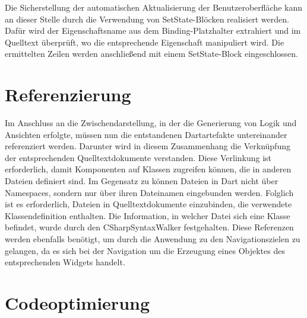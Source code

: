  

Die Sicherstellung der automatischen Aktualisierung der Benutzeroberfläche kann an dieser Stelle durch die Verwendung von SetState-Blöcken realisiert werden.  Dafür wird der Eigenschaftsname aus dem Binding-Platzhalter extrahiert und im Quelltext überprüft, wo die entsprechende Eigenschaft manipuliert wird.  Die ermittelten Zeilen werden anschließend mit einem SetState-Block eingeschlossen.


\section{Referenzierung}
Im Anschluss an die Zwischendarstellung, in der die Generierung von Logik und Ansichten erfolgte,  müssen nun die entstandenen Dartartefakte untereinander referenziert werden.  Darunter wird in diesem Zusammenhang die Verknüpfung der entsprechenden Quelltextdokumente verstanden.  Diese Verlinkung ist erforderlich,  damit Komponenten auf Klassen zugreifen können,  die in anderen Dateien definiert sind.  Im Gegensatz zu \Csharp{} können Dateien in Dart nicht über Namespaces, sondern nur über ihren Dateinamen eingebunden werden.  Folglich ist es erforderlich,  Dateien in Quelltextdokumente einzubinden,  die verwendete Klassendefinition enthalten.  Die Information,  in welcher Datei sich eine Klasse befindet, wurde durch den \glq CSharpSyntaxWalker\grq{} festgehalten.  Diese Referenzen werden ebenfalls benötigt,  um durch die Anwendung zu den Navigationszielen zu gelangen, da es sich bei der Navigation um die Erzeugung eines Objektes des entsprechenden Widgets handelt. 


\section{Codeoptimierung}

